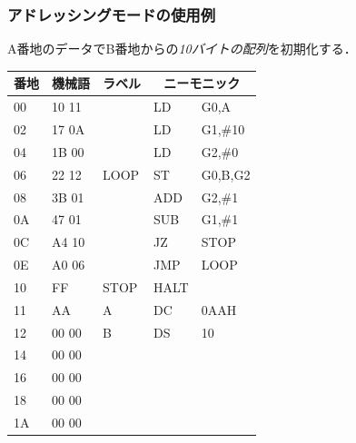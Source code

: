 \documentclass[handout]{beamer}        %
\begin{document}
\begin{frame}
  \frametitle{アドレッシングモードの使用例}
  A番地のデータでB番地からの\emph{10バイトの配列}を初期化する．
  \vfill
  \begin{minipage}{0.58\columnwidth}
    {\small\ttfamily\begin{center}
      \begin{tabular}{|l|l|l|l l|} \hline
        番地 & 機械語 & ラベル & \multicolumn{2}{|c|}{ニーモニック} \\
        \hline
        00 & 10 11 &      & LD   & G0,A          \\
        02 & 17 0A &      & LD   & G1,\#10       \\
        04 & 1B 00 &      & LD   & G2,\#0        \\
        06 & 22 12 & LOOP & ST   & G0,B,G2       \\
        08 & 3B 01 &      & ADD  & G2,\#1        \\
        0A & 47 01 &      & SUB  & G1,\#1        \\
        0C & A4 10 &      & JZ   & STOP          \\
        0E & A0 06 &      & JMP  & LOOP          \\
        10 & FF    & STOP & HALT &               \\
        11 & AA    & A    & DC   & 0AAH          \\
        12 & 00 00 & B    & DS   & 10            \\
        14 & 00 00 &      &      &               \\
        16 & 00 00 &      &      &               \\
        18 & 00 00 &      &      &               \\
        1A & 00 00 &      &      &               \\
        \hline
      \end{tabular}
    \end{center}}
  \end{minipage}
  \begin{minipage}{0.38\columnwidth}

\end{minipage}
\end{frame}
\end{document}
